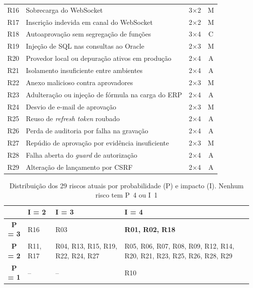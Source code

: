 \documentclass[conference]{IEEEtran}
\begin{document}
\begin{table}[!t]
\begin{tabularx}{\columnwidth}{@{}l Y c c@{}}
R16 & Sobrecarga do WebSocket & 3$\times$2 & M \\
R17 & Inscrição indevida em canal do WebSocket & 2$\times$2 & M \\
R18 & Autoaprovação sem segregação de funções & 3$\times$4 & C \\
R19 & Injeção de SQL nas consultas ao Oracle & 2$\times$3 & M \\
R20 & Provedor local ou depuração ativos em produção & 2$\times$4 & A \\
R21 & Isolamento insuficiente entre ambientes & 2$\times$4 & A \\
R22 & Anexo malicioso contra aprovadores & 2$\times$3 & M \\
R23 & Adulteração ou injeção de fórmula na carga do ERP & 2$\times$4 & A \\
R24 & Desvio de e-mail de aprovação & 2$\times$3 & M \\
R25 & Reuso de \textit{refresh token} roubado & 2$\times$4 & A \\
R26 & Perda de auditoria por falha na gravação & 2$\times$4 & A \\
R27 & Repúdio de aprovação por evidência insuficiente & 2$\times$3 & M \\
R28 & Falha aberta do \textit{guard} de autorização & 2$\times$4 & A \\
R29 & Alteração de lançamento por CSRF & 2$\times$4 & A \\
\hline
\end{tabularx}
\end{table}

\begin{table}[!t]
\centering
\caption{Distribuição dos 29 riscos atuais por probabilidade (P) e impacto (I). Nenhum risco tem P~4 ou I~1}
\label{tab:matriz}
\footnotesize
\renewcommand{\arraystretch}{1.2}
\begin{tabularx}{\columnwidth}{@{}c >{\raggedright\arraybackslash}p{1.1cm} >{\raggedright\arraybackslash}p{2.2cm} Y@{}}
\hline
 & \textbf{I = 2} & \textbf{I = 3} & \textbf{I = 4} \\
\hline
\textbf{P = 3} & R16 & R03 & \textbf{R01, R02, R18} \\
\textbf{P = 2} & R11, R17 & R04, R13, R15, R19, R22, R24, R27 & R05, R06, R07, R08, R09, R12, R14, R20, R21, R23, R25, R26, R28, R29 \\
\textbf{P = 1} & -- & -- & R10 \\
\hline
\end{tabularx}
\end{table}
\end{document}
